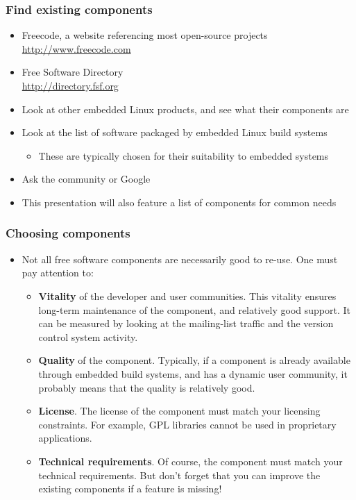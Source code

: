 \begin{frame}
  \frametitle{Find existing components}
  \begin{itemize}
  \item Freecode, a website referencing most open-source projects\\
    \url{http://www.freecode.com}
  \item Free Software Directory\\
    \url{http://directory.fsf.org}
  \item Look at other embedded Linux products, and see what their
    components are
  \item Look at the list of software packaged by embedded Linux build
    systems
    \begin{itemize}
    \item These are typically chosen for their suitability to embedded
      systems
    \end{itemize}
  \item Ask the community or Google
  \item This presentation will also feature a list of components for
    common needs
  \end{itemize}
\end{frame}

\begin{frame}
  \frametitle{Choosing components}
  \begin{itemize}
  \item Not all free software components are necessarily good to
    re-use. One must pay attention to:
    \begin{itemize}
    \item {\bf Vitality} of the developer and user communities. This
      vitality ensures long-term maintenance of the component, and
      relatively good support. It can be measured by looking at the
      mailing-list traffic and the version control system activity.
    \item {\bf Quality} of the component. Typically, if a component is
      already available through embedded build systems, and has a
      dynamic user community, it probably means that the quality is
      relatively good.
    \item {\bf License}. The license of the component must match your
      licensing constraints. For example, GPL libraries cannot be used
      in proprietary applications.
    \item {\bf Technical requirements}. Of course, the component must
      match your technical requirements. But don't forget that you can
      improve the existing components if a feature is missing!
    \end{itemize}
  \end{itemize}
\end{frame}

